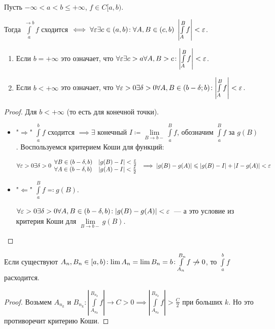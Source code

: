 \begin{theorem}
    Пусть $-\infty < a < b \le +\infty$, $f \in C[a, b)$.

    Тогда $\int\limits_a^{\to b} f$ сходится  $\iff \forall \varepsilon \exists c \in (a, b)\!: \forall A, B \in (c, b)\ \left|\int\limits_A^B f\right| < \varepsilon$. 
\end{theorem}
\begin{remark}
    \begin{enumerate}
        \item Если $b = +\infty$ это означает, что  $\forall \varepsilon \exists c > a \forall A, B > c\!: \left| \int\limits_A^B f \right|  < \varepsilon$.
        \item  Если $b < +\infty$ это означает, что  $\forall \varepsilon > 0 \exists \delta > 0 \forall A, B \in (b-\delta; b)\!: \left|\int\limits_A^B f \right| < \varepsilon$.
    \end{enumerate}
\end{remark}
\begin{proof}
    Для $b < +\infty$ (то есть для конечной точки). 
      \begin{itemize}
          \item "$\Rightarrow$" $\int\limits_a^b f$ сходится  $\implies \exists$ конечный  $I \coloneqq \lim\limits_{B \to b-} \int\limits_a^B f$, обозначим $\int\limits_a^B f$ за  $g(B)$. Воспользуемся критерием Коши для функций:

              \[\forall \varepsilon > 0 \exists \delta > 0 \begin{array}{lc} 
              \forall B \in (b - \delta, b) & |g(B) - I| < \frac{\varepsilon}{2}\\ 
          \forall A \in(b - \delta, b) & |g(A) - I| < \frac{\varepsilon}{2}\end{array} \implies |g(B) - g(A)| \leqslant |g(B) - I| + |I - g(A)| < \varepsilon\]
      \item "$\Leftarrow$" $\int\limits_a^B f \eqqcolon g(B)$.

          $\forall \varepsilon > 0 \exists \delta > 0 \forall A, B \in (b-\delta, b)\!: |g(B)- g(A)| < \varepsilon$~--- а это условие из критерия Коши для $\lim\limits_{B \to b-} g(B)$.
  \end{itemize}
\end{proof}
\begin{remark}
    Если существуют $A_n, B_n \in [a, b)\!: \lim A_n = \lim B_n = b\!: \int\limits_{A_n}^{B_n} f \centernot\to 0$, то  $\int\limits_a^b f$ расходится.
\end{remark}
\begin{proof}
    Возьмем $A_{n_k}$ и  $B_{n_k}\!: |\int\limits_{A_{n_k}}^{B_{n_k}} f| \to C > 0 \implies |\int\limits_{A_{n_k}}^{B_{n_k}} f| > \frac{C}{2}$ при больших $k$. Но это противоречит критерию Коши.
\end{proof}
